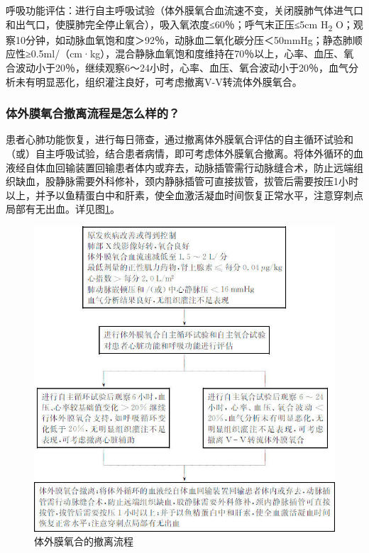 呼吸功能评估：进行自主呼吸试验（体外膜氧合血流速不变，关闭膜肺气体进气口和出气口，使膜肺完全停止氧合），吸入氧浓度≤60％；呼气末正压≤5cm
H\textsubscript{2}
O；观察10分钟，如动脉血氧饱和度＞92％，动脉血二氧化碳分压＜50mmHg；静态肺顺应性≥0.5ml/（cm·kg），混合静脉血氧饱和度维持在70％以上，心率、血压、氧合波动小于20％，继续观察6～24小时，心率、血压、氧合波动小于20％，血气分析未有明显恶化，组织灌注良好，可考虑撤离V-V转流体外膜氧合。

\subsubsection{体外膜氧合撤离流程是怎么样的？}

患者心肺功能恢复，进行每日筛查，通过撤离体外膜氧合评估的自主循环试验和（或）自主呼吸试验，结合患者病情，即可考虑体外膜氧合撤离。将体外循环的血液经自体血回输装置回输患者体内或弃去，动脉插管需行动脉缝合术，防止远端组织缺血，股静脉需要外科修补，颈内静脉插管可直接拔管，拔管后需要按压1小时以上，并予以鱼精蛋白中和肝素，使全血激活凝血时间恢复正常水平，注意穿刺点局部有无出血。详见图\ref{fig24-1}。

\begin{figure}[!htbp]
 \centering
 \includegraphics{./images/Image00287.jpg}
 \captionsetup{justification=centering}
 \caption{体外膜氧合的撤离流程}
 \label{fig24-1}
  \end{figure} 

